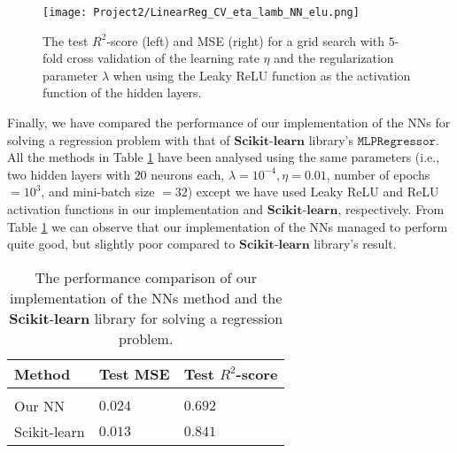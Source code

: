 \documentclass[a4paper]{article}
\begin{document}
\begin{figure}[H]
  \centering
  \texttt{[image: Project2/LinearReg\_CV\_eta\_lamb\_NN\_elu.png]}
  \caption{The test $R^2$-score (left) and MSE (right) for a grid search with $5$-fold cross validation of the learning rate $\eta$ and the regularization parameter $\lambda$ when using the Leaky ReLU function as the activation function of the hidden layers.}
    \label{LinearReg_CV_eta_lamb_NN_elu}
\end{figure}

Finally, we have compared the performance of our implementation of the NNs for solving a regression problem with that of $\mathbf{Scikit}$-$\mathbf{learn}$ library's $\texttt{MLPRegressor}$. All the methods in Table \ref{regNN} have been analysed using the same parameters (i.e., two hidden layers with $20$ neurons each, $\lambda=10^{-4},\eta=0.01$, number of epochs $=10^3$, and mini-batch size $=32$) except we have used Leaky ReLU and ReLU activation functions in our implementation and $\mathbf{Scikit}$-$\mathbf{learn}$, respectively. From Table \ref{regNN} we can observe that our implementation of the NNs managed to perform quite good, but slightly poor compared to $\mathbf{Scikit}$-$\mathbf{learn}$ library's result.

\begin{table}[H]
\begin{center}
  \begin{tabular}{| l | l | l |}
  \hline
    Method &  Test MSE & Test $R^2$-score \\[0.10cm]\hline\hline
     & &  \\
    Our NN & $0.024$ & $0.692$ \\[0.10cm]
    Scikit-learn & $0.013$ & $0.841$\\[0.10cm]
     \hline
  \end{tabular}
\end{center}
\caption{The performance comparison of our implementation of the NNs method and the $\mathbf{Scikit}$-$\mathbf{learn}$ library for solving a regression problem.}
\label{regNN}
\end{table}
\end{document}
